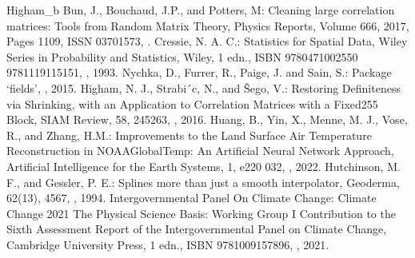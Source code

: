 \documentclass[letterpaper,10pt,english]{sphinxmanual}
\begin{document}
\begin{sphinxthebibliography}{Higham\_b}
\sphinxAtStartPar
Bun, J., Bouchaud, J.\sphinxhyphen{}P., and Potters, M: Cleaning large correlation matrices: Tools from Random Matrix Theory, Physics Reports, Volume 666, 2017, Pages 1\sphinxhyphen{}109, ISSN 0370\sphinxhyphen{}1573, .
\sphinxAtStartPar
{}
\sphinxAtStartPar
Cressie, N. A. C.: Statistics for Spatial Data, Wiley Series in Probability and Statistics, Wiley, 1 edn., ISBN 978\sphinxhyphen{}0\sphinxhyphen{}471\sphinxhyphen{}00255\sphinxhyphen{}0 978\sphinxhyphen{}1\sphinxhyphen{}119\sphinxhyphen{}11515\sphinxhyphen{}1, , 1993.
\sphinxAtStartPar
Nychka, D., Furrer, R., Paige, J. and Sain, S.: Package ‘fields’, , 2015.
\sphinxAtStartPar
Higham, N. J., Strabi´c, N., and Šego, V.: Restoring Definiteness via Shrinking, with an Application to Correlation Matrices with a Fixed255 Block, SIAM Review, 58, 245\textendash{}263, , 2016.
\sphinxAtStartPar
{}
\sphinxAtStartPar
Huang, B., Yin, X., Menne, M. J., Vose, R., and Zhang, H.\sphinxhyphen{}M.: Improvements to the Land Surface Air Temperature Reconstruction in NOAAGlobalTemp: An Artificial Neural Network Approach, Artificial Intelligence for the Earth Systems, 1, e220 032, , 2022.
\sphinxAtStartPar
Hutchinson, M. F., and  Gessler, P. E.: Splines \sphinxhyphen{} more than just a smooth interpolator, Geoderma, 62(1\sphinxhyphen{}3), 45\sphinxhyphen{}67, , 1994.
\sphinxAtStartPar
Intergovernmental Panel On Climate Change: Climate Change 2021 \textendash{} The Physical Science Basis: Working Group I Contribution to the Sixth Assessment Report of the Intergovernmental Panel on Climate Change, Cambridge University Press, 1 edn., ISBN 978\sphinxhyphen{}1\sphinxhyphen{}00\sphinxhyphen{}915789\sphinxhyphen{}6, , 2021.

\end{sphinxthebibliography}
\end{document}
